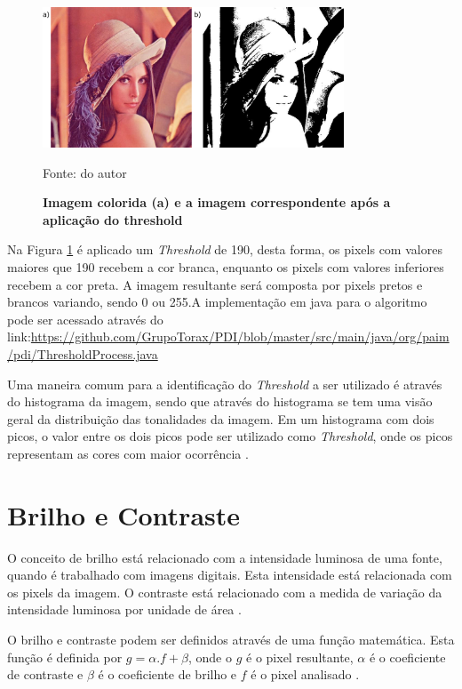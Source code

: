 \documentclass[
	12pt,				%
	oneside,			%
	a4paper,			%
	english,			%
	french,				%
	spanish,			%
	brazil,				%
	]{abntex2}
\begin{document}
\begin{figure}[ht]
\centering

\caption{\textbf{Imagem colorida (a) e a imagem correspondente após a aplicação do threshold}}
\includegraphics[width=0.8\textwidth]{imagens/limiarizacao.png}

Fonte: do autor
\label{fig:limiarizacaofig}
\end{figure}

Na Figura \ref{fig:limiarizacaofig} é aplicado um \textit{Threshold} de 190, desta forma, os pixels com valores maiores que 190 recebem a cor branca, enquanto os pixels com valores inferiores recebem a cor preta. A imagem resultante será composta por pixels pretos e brancos variando, sendo 0 ou 255.A implementação em java para o algoritmo pode ser acessado através do link:\url{https://github.com/GrupoTorax/PDI/blob/master/src/main/java/org/paim/pdi/ThresholdProcess.java}

Uma maneira comum para a identificação do \textit{Threshold} a ser utilizado é através do histograma da imagem, sendo que através do histograma se tem uma visão geral da distribuição das tonalidades da imagem. Em um histograma com dois picos, o valor entre os dois picos pode ser utilizado como \textit{Threshold}, onde os picos representam as cores com maior ocorrência \cite{gonzalesWoods:2008}. 

\section{Brilho e Contraste}
O conceito de brilho está relacionado com a intensidade luminosa de uma fonte, quando é trabalhado com imagens digitais. Esta intensidade está relacionada com os pixels da imagem. O contraste está relacionado com a medida de variação da intensidade luminosa por unidade de área \cite{gonzalesWoods:2008}.

O brilho e contraste podem ser definidos através de uma função matemática. Esta função é definida por \(g = \alpha.f + \beta\), onde o \(g\) é o pixel resultante, \(\alpha\) é o coeficiente de contraste e \(\beta\) é o coeficiente de brilho e \(f\) é o pixel analisado \cite{pedriniSchwartz:2008}.
\end{document}

